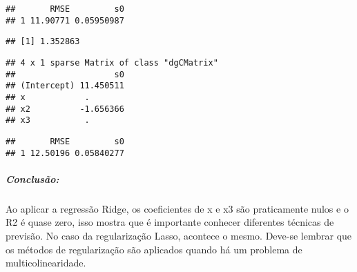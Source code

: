 \documentclass[]{article}
\newenvironment{Shaded}{\begin{snugshade}}{\end{snugshade}}
\newcommand{\CommentTok}[1]{\textcolor[rgb]{0.56,0.35,0.01}{\textit{#1}}}
\newcommand{\DataTypeTok}[1]{\textcolor[rgb]{0.13,0.29,0.53}{#1}}
\newcommand{\DecValTok}[1]{\textcolor[rgb]{0.00,0.00,0.81}{#1}}
\newcommand{\KeywordTok}[1]{\textcolor[rgb]{0.13,0.29,0.53}{\textbf{#1}}}
\newcommand{\NormalTok}[1]{#1}
\newcommand{\OperatorTok}[1]{\textcolor[rgb]{0.81,0.36,0.00}{\textbf{#1}}}
\newcommand{\StringTok}[1]{\textcolor[rgb]{0.31,0.60,0.02}{#1}}
\let\oldsubparagraph\subparagraph
\renewcommand{\subparagraph}[1]{\oldsubparagraph{#1}\mbox{}}
\begin{document}
\begin{verbatim}
##       RMSE         s0
## 1 11.90771 0.05950987
\end{verbatim}

\begin{Shaded}
\end{Shaded}

\begin{verbatim}
## [1] 1.352863
\end{verbatim}

\begin{Shaded}
\end{Shaded}

\begin{verbatim}
## 4 x 1 sparse Matrix of class "dgCMatrix"
##                    s0
## (Intercept) 11.450511
## x            .       
## x2          -1.656366
## x3           .
\end{verbatim}

\begin{Shaded}
\end{Shaded}

\begin{verbatim}
##       RMSE         s0
## 1 12.50196 0.05840277
\end{verbatim}

\hypertarget{conclusuxe3o}{%
\subparagraph{Conclusão:}\label{conclusuxe3o}}

Ao aplicar a regressão Ridge, os coeficientes de x e x3 são praticamente
nulos e o R2 é quase zero, isso mostra que é importante conhecer
diferentes técnicas de previsão. No caso da regularização Lasso,
acontece o mesmo. Deve-se lembrar que os métodos de regularização são
aplicados quando há um problema de multicolinearidade.
\end{document}
